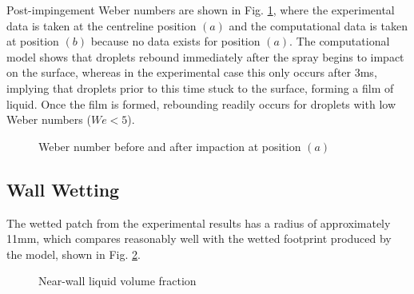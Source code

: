 \documentclass[a4paper,10pt]{article}
\begin{document}
Post-impingement Weber numbers are shown in Fig. \ref{fig:we_prepost}, where the experimental data is taken at the centreline position $(a)$ and the computational data is taken at position $(b)$ because no data exists for position $(a)$. The computational model shows that droplets rebound immediately after the spray begins to impact on the surface, whereas in the experimental case this only occurs after 3ms, implying that droplets prior to this time stuck to the surface, forming a film of liquid. Once the film is formed, rebounding readily occurs for droplets with low Weber numbers ($We<5$).
\begin{figure}[H]
\centering
{}
\caption{Weber number before and after impaction at position $(a)$}
\label{fig:we_prepost}
\end{figure}



\subsection{Wall Wetting}
The wetted patch from the experimental results has a radius of approximately 11mm, which compares reasonably well with the wetted footprint produced by the model, shown in Fig. \ref{fig:film}.
\begin{figure}[H]
\centering
{}
\caption{Near-wall liquid volume fraction}
\label{fig:film}
\end{figure}
\end{document}
